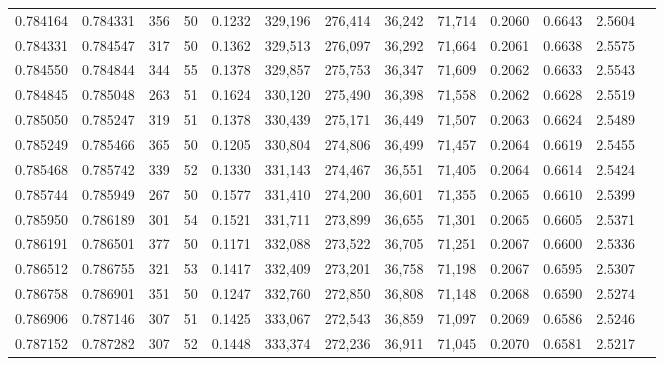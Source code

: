\begin{tabular}{rrrrrrrrrrrrr}
0.784164 & 0.784331 &   356 &  50 &                                     0.1232 & 329,196 & 276,414 &  36,242 &  71,714 & 0.2060 & 0.6643 & 2.5604 \\
0.784331 & 0.784547 &   317 &  50 &                                     0.1362 & 329,513 & 276,097 &  36,292 &  71,664 & 0.2061 & 0.6638 & 2.5575 \\
0.784550 & 0.784844 &   344 &  55 &                                     0.1378 & 329,857 & 275,753 &  36,347 &  71,609 & 0.2062 & 0.6633 & 2.5543 \\
0.784845 & 0.785048 &   263 &  51 &                                     0.1624 & 330,120 & 275,490 &  36,398 &  71,558 & 0.2062 & 0.6628 & 2.5519 \\
0.785050 & 0.785247 &   319 &  51 &                                     0.1378 & 330,439 & 275,171 &  36,449 &  71,507 & 0.2063 & 0.6624 & 2.5489 \\
0.785249 & 0.785466 &   365 &  50 &                                     0.1205 & 330,804 & 274,806 &  36,499 &  71,457 & 0.2064 & 0.6619 & 2.5455 \\
0.785468 & 0.785742 &   339 &  52 &                                     0.1330 & 331,143 & 274,467 &  36,551 &  71,405 & 0.2064 & 0.6614 & 2.5424 \\
0.785744 & 0.785949 &   267 &  50 &                                     0.1577 & 331,410 & 274,200 &  36,601 &  71,355 & 0.2065 & 0.6610 & 2.5399 \\
0.785950 & 0.786189 &   301 &  54 &                                     0.1521 & 331,711 & 273,899 &  36,655 &  71,301 & 0.2065 & 0.6605 & 2.5371 \\
0.786191 & 0.786501 &   377 &  50 &                                     0.1171 & 332,088 & 273,522 &  36,705 &  71,251 & 0.2067 & 0.6600 & 2.5336 \\
0.786512 & 0.786755 &   321 &  53 &                                     0.1417 & 332,409 & 273,201 &  36,758 &  71,198 & 0.2067 & 0.6595 & 2.5307 \\
0.786758 & 0.786901 &   351 &  50 &                                     0.1247 & 332,760 & 272,850 &  36,808 &  71,148 & 0.2068 & 0.6590 & 2.5274 \\
0.786906 & 0.787146 &   307 &  51 &                                     0.1425 & 333,067 & 272,543 &  36,859 &  71,097 & 0.2069 & 0.6586 & 2.5246 \\
0.787152 & 0.787282 &   307 &  52 &                                     0.1448 & 333,374 & 272,236 &  36,911 &  71,045 & 0.2070 & 0.6581 & 2.5217 \\

\end{tabular}
